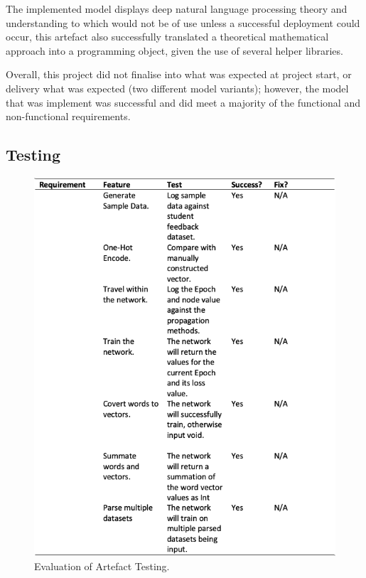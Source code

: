 The implemented model displays deep natural language processing theory and understanding to which would not be of use unless a successful deployment could occur, this artefact also successfully translated a theoretical mathematical approach into a programming object, given the use of several helper libraries.

Overall, this project did not finalise into what was expected at project start, or delivery what was expected (two different model variants); however, the model that was implement was successful and did meet a majority of the functional and non-functional requirements.

\subsection{Testing}

\begin{figure}[H]
    \centering
    \includegraphics[width=\textwidth]{figures/chapter-7/Testing.png}
    \caption[Evaluation of Artefact Testing]{Evaluation of Artefact Testing.
    \label{fig:Testing}}
\end{figure}
